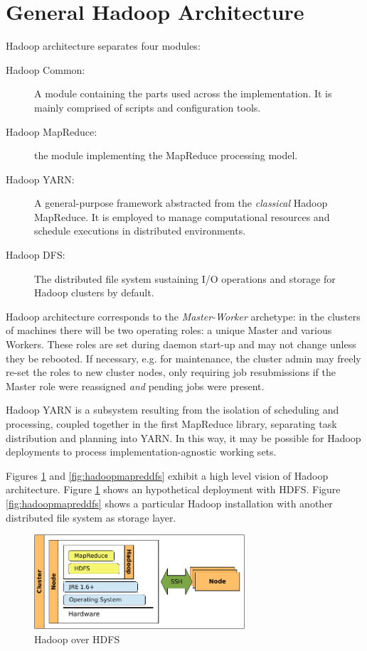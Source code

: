 \section{General Hadoop Architecture}\label{sec:arquitecturahadoop}
\noindent Hadoop architecture separates four modules:
\begin{description}
 \item[Hadoop Common:] A module containing the parts used across the implementation. It is mainly comprised of scripts and configuration tools.
 \item[Hadoop MapReduce:] the module implementing the MapReduce processing model.
 \item[Hadoop YARN:] A general-purpose framework abstracted from the \emph{classical} Hadoop MapReduce. It is employed to manage computational resources and schedule executions in distributed environments.
 \item[Hadoop DFS:] The distributed file system sustaining I/O operations and storage for Hadoop clusters by default.
\end{description}

Hadoop architecture corresponds to the \emph{Master-Worker} archetype: in the clusters of machines there will be two operating roles: a unique Master and various Workers. These roles are set during daemon start-up and may not change unless they be rebooted. If necessary, e.g. for maintenance, the cluster admin may freely re-set the roles to new cluster nodes, only requiring job resubmissions if the Master role were reassigned \emph{and} pending jobs were present.

Hadoop YARN is a subsystem resulting from the isolation of scheduling and processing, coupled together in the first MapReduce library, separating task distribution and planning into YARN. In this way, it may be possible for Hadoop deployments to process implementation-agnostic working sets.

Figures \ref{fig:hadoopmapredhdfs} and \ref{fig:hadoopmapreddfs} exhibit a high level vision of Hadoop architecture. Figure \ref{fig:hadoopmapredhdfs} shows an hypothetical deployment with HDFS. Figure \ref{fig:hadoopmapreddfs} shows a particular Hadoop installation with another distributed file system as storage layer.

\begin{figure}[tbp]
\begin{center}
\includegraphics[width=0.7\textwidth]{imagenes/015.pdf}
 \caption{Hadoop over HDFS}
\label{fig:hadoopmapredhdfs}
\end{center}
\end{figure}

